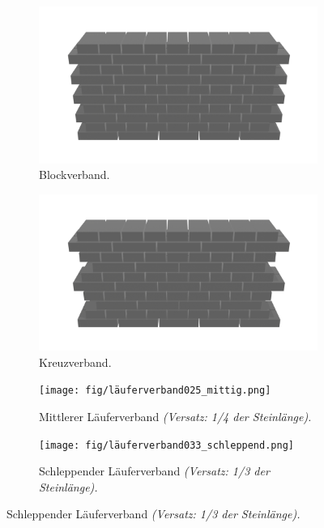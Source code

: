 \begin{figure}[h!]
  \begin{subfigure}[b]{0.5\columnwidth}
    \includegraphics[width=\columnwidth]{fig/blockverband.png}
    \caption{Blockverband.}
    \label{fig:basics:blockverband}
  \end{subfigure}
  \hfill
  \begin{subfigure}[b]{0.5\columnwidth}
    \includegraphics[width=\columnwidth]{fig/kreuzverband.png}
    \caption{Kreuzverband.}
    \label{fig:basics:kreuzverband}
  \end{subfigure}
  \begin{subfigure}[b]{0.5\columnwidth}
    \texttt{[image: fig/läuferverband025\_mittig.png]}
    \caption{Mittlerer Läuferverband \textit{(Versatz: 1/4 der Steinlänge).}}
    \label{fig:basics:läuferverband_mittig}
  \end{subfigure}
  \begin{subfigure}[b]{0.5\columnwidth}
    \texttt{[image: fig/läuferverband033\_schleppend.png]}
    \caption{Schleppender Läuferverband \textit{(Versatz: 1/3 der Steinlänge).}}
    \label{fig:basics:läuferverband_schleppend}

\end{subfigure}
\end{figure}
